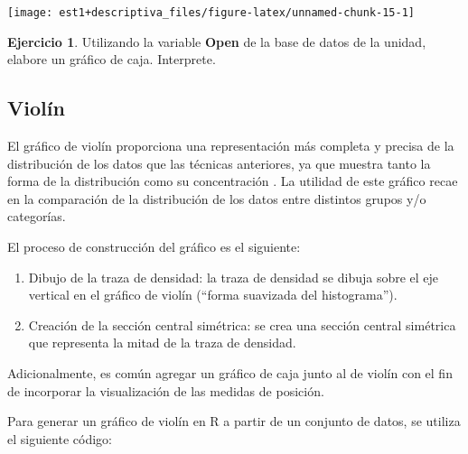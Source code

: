 \documentclass[
]{book}
\providecommand{\tightlist}{%
  \setlength{\itemsep}{0pt}\setlength{\parskip}{0pt}}
\theoremstyle{definition}
\theoremstyle{definition}
\theoremstyle{definition}
\newtheorem{exercise}{Ejercicio}[chapter]
\theoremstyle{definition}
\theoremstyle{remark}
\begin{document}
\begin{center}\texttt{[image: est1+descriptiva\_files/figure-latex/unnamed-chunk-15-1]} \end{center}

\begin{exercise}
Utilizando la variable \textbf{Open} de la base de datos de la unidad, elabore un gráfico de caja. Interprete.
\end{exercise}

\hypertarget{violuxedn}{%
\subsection{Violín}\label{violuxedn}}

El gráfico de violín proporciona una representación más completa y precisa de la distribución de los datos que las técnicas anteriores, ya que muestra tanto la forma de la distribución como su concentración \citep{hintze1998violin}. La utilidad de este gráfico recae en la comparación de la distribución de los datos entre distintos grupos y/o categorías.

El proceso de construcción del gráfico es el siguiente:

\begin{enumerate}
\def\labelenumi{\arabic{enumi}.}
\tightlist
\item
  Dibujo de la traza de densidad: la traza de densidad se dibuja sobre el eje vertical en el gráfico de violín (``forma suavizada del histograma'').
\item
  Creación de la sección central simétrica: se crea una sección central simétrica que representa la mitad de la traza de densidad.
\end{enumerate}

Adicionalmente, es común agregar un gráfico de caja junto al de violín con el fin de incorporar la visualización de las medidas de posición.

Para generar un gráfico de violín en R a partir de un conjunto de datos, se utiliza el siguiente código:
\end{document}

